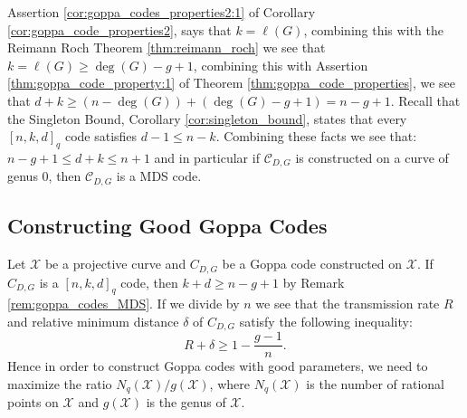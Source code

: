 \begin{remark}\label{rem:goppa_codes_MDS}
  Assertion \ref{cor:goppa_codes_properties2:1} of Corollary \ref{cor:goppa_code_properties2}, says that $k = \ell(G)$, combining this with the Reimann Roch Theorem \ref{thm:reimann_roch} we see that $k = \ell(G) \geq \deg(G) - g + 1$, combining this with Assertion \ref{thm:goppa_code_property:1} of Theorem \ref{thm:goppa_code_properties}, we see that $d + k \geq (n - \deg(G)) + (\deg(G) - g + 1) = n - g + 1$.
  Recall that the Singleton Bound, Corollary \ref{cor:singleton_bound}, states that every $[n, k, d]_{q}$ code satisfies $d - 1 \leq n - k$. Combining these facts we see that: $n - g + 1 \leq d + k \leq n + 1$ and in particular if $\mathcal{C}_{D, G}$ is constructed on a curve of genus $0$, then $\mathcal{C}_{D, G}$ is a MDS code.
\end{remark}

\newpage
\subsection{Constructing Good Goppa Codes}

Let $\mathcal{X}$ be a projective curve and $C_{D, G}$ be a Goppa code constructed on $\mathcal{X}$. If $C_{D, G}$ is a $[n, k, d]_{q}$ code, then $k + d \geq n - g + 1$ by Remark \ref{rem:goppa_codes_MDS}. If we divide by $n$ we see that the transmission rate $R$ and relative minimum distance $\delta$ of $C_{D, G}$ satisfy the following inequality:
\begin{equation}\label{eq:R_and_delta_of_goppa}
  R + \delta  \geq 1 - \frac{g - 1}{n}.
\end{equation}
Hence in order to construct Goppa codes with good parameters, we need to maximize the ratio $N_{q}(\mathcal{X}) / g(\mathcal{X})$, where $N_q(\mathcal{X})$ is the number of rational points on $\mathcal{X}$ and $g(\mathcal{X})$ is the genus of $\mathcal{X}$.

